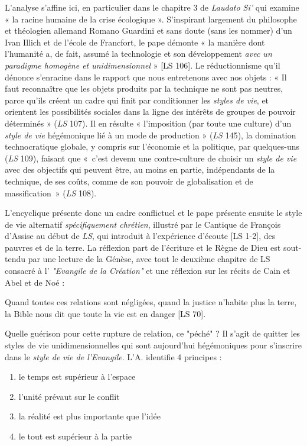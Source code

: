 \begin{singlequote}
 L’analyse s’affine ici, en particulier dans le chapitre 3 de \textit{Laudato Si’} qui examine « la racine humaine de la crise écologique ». S’inspirant largement du philosophe et théologien allemand Romano Guardini et sans doute (sans les nommer) d’un Ivan Illich et de l’école de Francfort, le pape démonte « la manière dont l’humanité a, de fait, assumé la technologie et son développement  \textit{avec un paradigme homogène et unidimensionnel} » [LS 106]. Le réductionnisme qu’il dénonce s’enracine dans le rapport que nous entretenons avec nos objets : « Il faut reconnaître que les objets produits par la technique ne sont pas neutres, parce qu’ils créent un cadre qui finit par conditionner les \textit{styles de vie}, et orientent les possibilités sociales dans la ligne des intérêts de groupes de pouvoir déterminés » (\textit{LS} 107). Il en résulte « l’imposition (par toute une culture) d’un \textit{style de vie} hégémonique lié à un mode de production » (\textit{LS} 145), la domination technocratique globale, y compris sur l’économie et la politique, par quelques-uns (\textit{LS} 109), faisant que « c’est devenu une contre-culture de choisir un \textit{style de vie }avec des objectifs qui peuvent être, au moins en partie, indépendants de la technique, de ses coûts, comme de son pouvoir de globalisation et de massification » (\textit{LS} 108). \cite[par. 12]{theobald_lenseignement_2016} \label{theo:diagnosticLS}
\end{singlequote}
L'encyclique présente donc un cadre conflictuel et le pape présente ensuite le style de vie alternatif \textit{spécifiquement chrétien}, illustré par le Cantique de François d'Assise au début de \textit{LS}, qui  introduit à l'expérience d'écoute [LS 1-2], des pauvres et de la terre.
La réflexion part de l'écriture et le Règne de Dieu est sout-tendu par une lecture de la Génèse, avec tout le deuxième chapitre de LS consacré à l' \textit{"Evangile de la Création"} et une réflexion sur les récits de Cain et Abel et de Noé :
\begin{singlequote}
    Quand toutes ces relations sont négligées, quand la justice n'habite plus la terre, la Bible nous dit que toute la vie est en danger [LS 70].
\end{singlequote}
Quelle guérison pour cette rupture de relation, ce "péché" ? Il s'agit de quitter les styles de vie unidimensionnelles qui sont aujourd'hui hégémoniques pour s'inscrire dans le \textit{style de vie de l'Evangile}. L'A. identifie 4 principes :
\begin{enumerate}
    \item le temps est supérieur à l'espace
    \item l'unité prévaut sur le conflit
    \item la réalité est plus importante que l'idée
    \item le tout est supérieur à la partie \label{theo:principesLS}

\end{enumerate}
